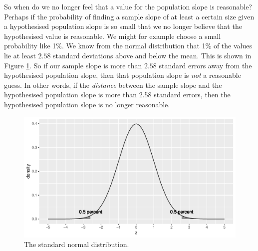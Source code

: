 \documentclass[]{book}\usepackage[]{graphicx}\usepackage[]{color}
\makeatletter
\def\maxwidth{ %
  \ifdim\Gin@nat@width>\linewidth
    \linewidth
  \else
    \Gin@nat@width
  \fi
}
\newenvironment{knitrout}{}{} %
\makeatother
\begin{document}
So when do we no longer feel that a value for the population slope is reasonable? Perhaps if the probability of finding a sample slope of at least a certain size given a hypothesised population slope is so small that we no longer believe that the hypothesised value is reasonable. We might for example choose a small probability like 1\%. We know from the normal distribution that 1\% of the values lie at least $2.58$ standard deviations above and below the mean. This is shown in Figure \ref{fig:normal_2z}. So if our sample slope is more than $2.58$ standard errors away from the hypothesised population slope, then that population slope is \textit{not} a reasonable guess. In other words, if the \textit{distance} between the sample slope and the hypothesised population slope is more than 2.58 standard errors, then the hypothesised population slope is no longer reasonable.

\begin{knitrout}
\color{fgcolor}\begin{figure}

{\centering \includegraphics[width=\maxwidth]{figure/normal_2z-1} 

}

\caption[The standard normal distribution]{The standard normal distribution.}\label{fig:normal_2z}
\end{figure}


\end{knitrout}
\end{document}
